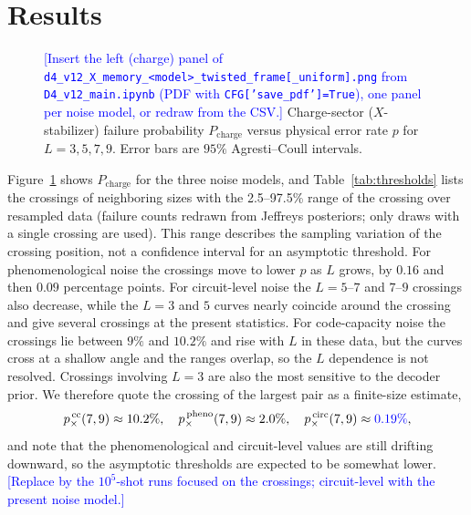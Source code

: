 \documentclass[a4paper]{article}
\newcommand{\blue}[1]{\textcolor{blue}{#1}}
\begin{document}
\section{Results}
\label{sec:results}

\begin{figure}[t]
  \centering
  \fbox{\rule{0pt}{50mm}\rule{0.82\linewidth}{0pt}}
  \caption{\blue{[Insert the left (charge) panel of \texttt{d4\_v12\_X\_memory\_<model>\_twisted\_frame[\_uniform].png} from \texttt{D4\_v12\_main.ipynb} (PDF with \texttt{CFG['save\_pdf']=True}), one panel per noise model, or redraw from the CSV.]} Charge-sector ($X$-stabilizer) failure probability $P_{\mathrm{charge}}$ versus physical error rate $p$ for $L=3,5,7,9$. Error bars are $95\%$ Agresti--Coull intervals.}
  \label{fig:threshold}
\end{figure}

Figure~\ref{fig:threshold} shows $P_{\mathrm{charge}}$ for the three noise models, and Table~\ref{tab:thresholds} lists the crossings of neighboring sizes with the 2.5--97.5\% range of the crossing over resampled data (failure counts redrawn from Jeffreys posteriors; only draws with a single crossing are used). This range describes the sampling variation of the crossing position, not a confidence interval for an asymptotic threshold. For phenomenological noise the crossings move to lower $p$ as $L$ grows, by $0.16$ and then $0.09$ percentage points. For circuit-level noise the $L=5$--$7$ and $7$--$9$ crossings also decrease, while the $L=3$ and $5$ curves nearly coincide around the crossing and give several crossings at the present statistics. For code-capacity noise the crossings lie between $9\%$ and $10.2\%$ and rise with $L$ in these data, but the curves cross at a shallow angle and the ranges overlap, so the $L$ dependence is not resolved. Crossings involving $L=3$ are also the most sensitive to the decoder prior. We therefore quote the crossing of the largest pair as a finite-size estimate,
\begin{equation}
  p_\times^{\,\mathrm{cc}}(7,9)\approx10.2\%,\quad
  p_\times^{\,\mathrm{pheno}}(7,9)\approx2.0\%,\quad
  p_\times^{\,\mathrm{circ}}(7,9)\approx\blue{0.19\%},
\end{equation}
and note that the phenomenological and circuit-level values are still drifting downward, so the asymptotic thresholds are expected to be somewhat lower. \blue{[Replace by the $10^5$-shot runs focused on the crossings; circuit-level with the present noise model.]}
\end{document}

